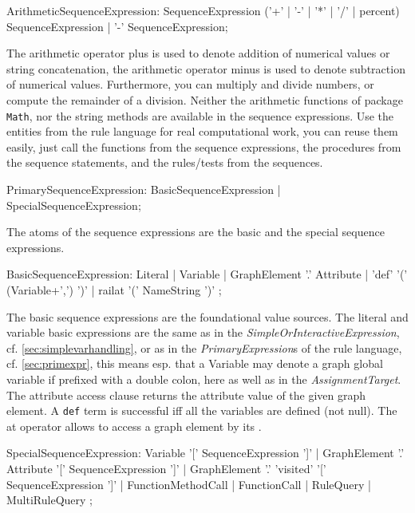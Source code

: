 \begin{rail}
  ArithmeticSequenceExpression:
    SequenceExpression ('+' | '-' | '*' | '/' | percent) SequenceExpression |
		'-' SequenceExpression;
\end{rail}

The arithmetic operator plus is used to denote addition of numerical values or string concatenation,
the arithmetic operator minus is used to denote subtraction of numerical values.
Furthermore, you can multiply and divide numbers, or compute the remainder of a division.
Neither the arithmetic functions of package \texttt{Math}, nor the string methods are available in the sequence expressions.
Use the entities from the rule language for real computational work, you can reuse them easily, just call the functions from the sequence expressions, the procedures from the sequence statements, and the rules/tests from the sequences.

\begin{rail}
  PrimarySequenceExpression:
    BasicSequenceExpression |
    SpecialSequenceExpression;
\end{rail}

The atoms of the sequence expressions are the basic and the special sequence expressions.

\begin{rail}
  BasicSequenceExpression:
    Literal |
    Variable | 
    GraphElement '.' Attribute |
    'def' '(' (Variable+',') ')' |
    railat '(' NameString ')'
  ;
\end{rail}

The basic sequence expressions are the foundational value sources.
The literal and variable basic expressions are the same as in the \emph{SimpleOrInteractiveExpression}, cf. \ref{sec:simplevarhandling}, or as in the \emph{PrimaryExpression}s of the rule language, cf. \ref{sec:primexpr},
this means esp. that a Variable may denote a graph global variable if prefixed with a double colon, here as well as in the \emph{AssignmentTarget}.
The attribute access clause returns the attribute value of the given graph element.
A \texttt{def} term is successful iff all the variables are defined (not null).
The at operator allows to access a graph element by its .

\begin{rail}
  SpecialSequenceExpression:
    Variable '[' SequenceExpression ']' |
    GraphElement '.' Attribute '[' SequenceExpression ']' |
    GraphElement '.' 'visited' '[' SequenceExpression ']' |
    FunctionMethodCall |
    FunctionCall |
    RuleQuery |
    MultiRuleQuery
  ;
\end{rail}

